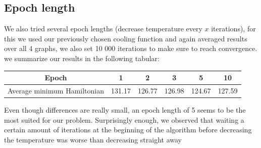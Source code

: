 \documentclass[a4paper]{article}
\begin{document}
\subsection{Epoch length}
We also tried several epoch lengths (decrease temperature every $x$ iterations), for this we used our previously chosen cooling function and again averaged results over all 4 graphs, we also set 10 000 iterations to make sure to reach convergence. we summarize our results in the following tabular:
\begin{center}
\begin{tabular}{| c || c | c| c| c| c|}
\hline
Epoch & 1 & 2 & 3 & 5 & 10\\
\hline
Average minimum Hamiltonian & 131.17 & 126.77 & 126.98 & 124.67 & 127.59\\
\hline
\end{tabular}
\end{center}
Even though differences are really small, an epoch length of 5 seems to be the most suited for our problem.
Surprisingly enough, we observed that waiting a certain amount of iterations at the beginning of the algorithm before decreasing the temperature was worse than decreasing straight away 



\end{document}
